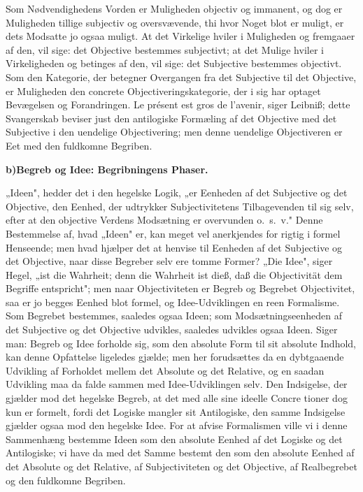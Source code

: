 \documentclass[12pt]{book}
\newcommand{\opage}[1]{\marginnote{\footnotesize\textit{[#1]}}}
\begin{document}
Som Nødvendighedens Vorden er Muligheden objectiv og immanent, og dog er Muligheden tillige
subjectiv og oversvævende, thi hvor Noget blot er muligt, er dets Modsatte
\opage{177} jo ogsaa muligt. At det Virkelige hviler i Muligheden og fremgaaer af den, vil sige: det
Objective bestemmes subjectivt; at det Mulige hviler i Virkeligheden og betinges af den, vil
sige: det Subjective bestemmes objectivt. Som den Kategorie, der betegner Overgangen fra det
Subjective til det Objective, er Muligheden den concrete Objectiveringskategorie, der i sig har
optaget Bevægelsen og Forandringen. Le présent est gros de l'avenir, siger Leibniß; dette
Svangerskab beviser just den antilogiske Formæling af det Objective med det Subjective i den
uendelige Objectivering; men denne uendelige Objectiveren er Eet med den fuldkomne Begriben.

\begin{center}
{\bfseries b)\quad Begreb og Idee: Begribningens Phaser.}
\end{center}

„Ideen", hedder det i den hegelske Logik, „er Eenheden af det Subjective og det Objective, den
Eenhed, der udtrykker Subjectivitetens Tilbagevenden til sig selv, efter at den objective Verdens
Modsætning er overvunden o.\ s.\ v." Denne Bestemmelse af, hvad „Ideen" er, kan meget vel
anerkjendes for rigtig i formel Henseende; men hvad hjælper det at henvise til Eenheden af det
Subjective og det Objective, naar disse Begreber selv ere tomme Former? „Die Idee", siger Hegel,
„ist die Wahrheit; denn die Wahrheit ist dieß, daß die Objectivität dem Begriffe entspricht";
men naar Objectiviteten er Begreb og Begrebet Objectivitet, saa er jo begges Eenhed blot formel,
og Idee-Udviklingen en reen Formalisme. Som Begrebet bestemmes, saaledes ogsaa Ideen; som
Modsætningseenheden af det Subjective og det Objective udvikles, saaledes udvikles ogsaa Ideen.
Siger man: Begreb og Idee forholde sig, som den absolute Form til sit absolute Indhold, kan denne
Opfattelse ligeledes gjælde; men her forudsættes da en dybtgaaende Udvikling af Forholdet mellem
det Absolute og det Relative, og en saadan Udvikling maa da falde sammen med Idee-Udviklingen
selv. Den Indsigelse, der gjælder mod det hegelske Begreb, at det med alle sine ideelle Concre%
\opage{178} tioner dog kun er formelt, fordi det Logiske mangler sit Antilogiske, den samme Indsigelse
gjælder ogsaa mod den hegelske Idee. For at afvise Formalismen ville vi i denne Sammenhæng
bestemme Ideen som den absolute Eenhed af det Logiske og det Antilogiske; vi have da med det
Samme bestemt den som den absolute Eenhed af det Absolute og det Relative, af Subjectiviteten og
det Objective, af Realbegrebet og den fuldkomne Begriben.
\end{document}

